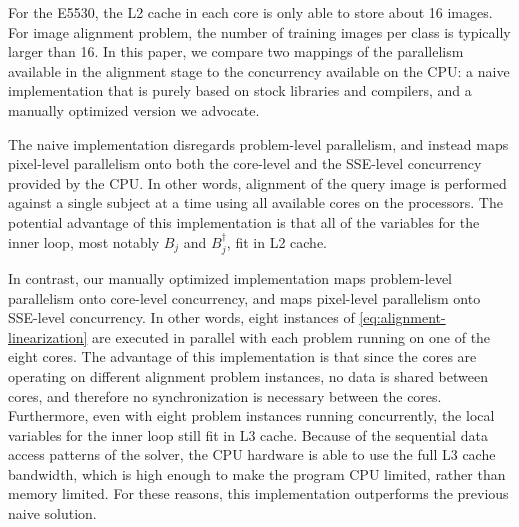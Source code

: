 \documentclass[preprint]{sigplanconf}
\begin{document}
For the E5530, the L2 cache in each core is only able to store about 16 images.
For image alignment problem, the number of training images per class is
typically larger than 16.  
In this paper, we compare two mappings of the parallelism available in the alignment
stage to the concurrency available on the CPU: a naive implementation that is purely 
based on stock libraries and compilers, and a manually optimized version we advocate.

The naive implementation disregards 
problem-level parallelism, and instead maps pixel-level parallelism
onto both the core-level and the SSE-level concurrency provided by the CPU.  In
other words, alignment of the query image is performed
against a single subject at a time using all available cores on
the processors.  The potential advantage of this implementation is that all of the variables
for the inner loop, most notably $B_j$ and $B_j^\dagger$, fit in L2 cache.  

In contrast, our manually optimized implementation maps problem-level parallelism onto core-level
concurrency, and maps pixel-level parallelism onto SSE-level concurrency.  In
other words, eight instances of \eqref{eq:alignment-linearization} are executed
in parallel with each problem running on one of the eight cores.  The advantage
of this implementation is that since the cores are operating on different
alignment problem instances, no data is shared between cores, and therefore no
synchronization is necessary between the cores.  Furthermore, even with eight
problem instances running concurrently, the local variables for the inner
loop still fit in L3 cache.  Because of the sequential data access patterns of
the solver, the CPU hardware is able to use the full L3 cache bandwidth, which is 
high enough to make the program CPU limited, rather than memory limited.  
For these reasons, this implementation outperforms the previous naive solution.


\end{document}
